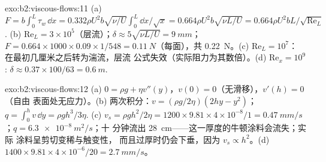 \begin{solution}{exo:b2:viscous-flows:11}
(a) $F = b\int_0^L\tau_w\,\dd x = 0.332\rho U^2b\sqrt{\nu/U}\int_0^L\dd x/\sqrt x =
0.664\rho U^2b\sqrt{\nu L/U} = 0.664\rho U^2bL/\sqrt{\mathrm{Re}_L}$. (b) $\mathrm{Re}_L =
3 \times 10^5$（层流）；$\delta \approx 5\sqrt{\nu L/U} = \qty{9}{mm}$；$F = 0.664 \times 1000
\times 0.09 \times 1/548 = \qty{0.11}{N}$（每面），共 \qty{0.22}{N}。(c) $\mathrm{Re}_L = 10^7$：
在最初几厘米之后转为湍流，层流
公式失效（实际阻力为其数倍）。(d) $\mathrm{Re}_x =
10^9$: $\delta \approx 0.37 \times 100/63 = \qty{0.6}{m}$.
\end{solution}

\begin{solution}{exo:b2:viscous-flows:12}
(a) $0 = \rho g + \eta v''(y)$，$v(0) = 0$（无滑移），$v'(h) = 0$（自由
表面处无应力）。(b) 两次积分：$v = (\rho g/2\eta)(2hy - y^2)$；$q =
\int_0^hv\,\dd y = \rho gh^3/3\eta$. (c) $v_s = \rho gh^2/2\eta = 1200 \times 9.81 \times
4 \times 10^{-8}/1 = \qty{0.47}{mm/s}$；$q = \qty{6.3e-8}{m^2/s}$；十
分钟流出 \qty{28}{cm}——这一厚度的牛顿涂料会流失；实际
涂料呈剪切变稀与触变性，
而且过厚时仍会下垂，因为 $v_s \propto h^2$。(d) $1400 \times 9.81 \times 4 \times 10^{-6}/20 = \qty{2.7}{mm/s}$。
\end{solution}

